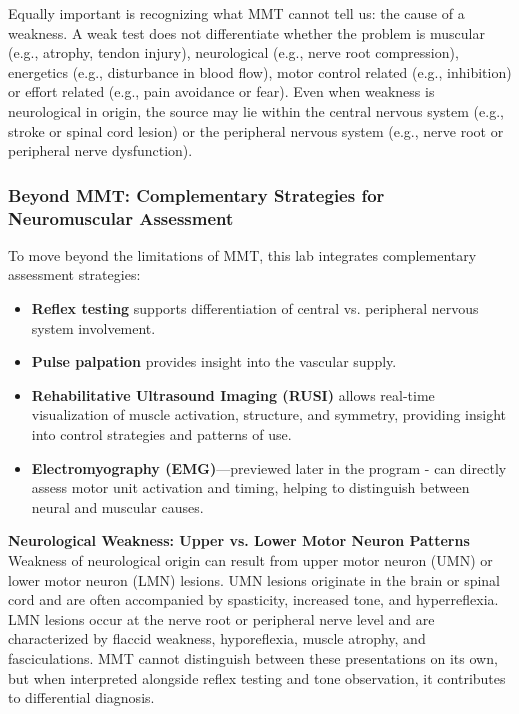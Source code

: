 Equally important is recognizing what MMT cannot tell us: the cause of a weakness. A weak test does not differentiate whether the problem is muscular (e.g., atrophy, tendon injury), neurological (e.g., nerve root compression), energetics (e.g., disturbance in blood flow), motor control related (e.g., inhibition) or effort related (e.g., pain avoidance or fear). Even when weakness is neurological in origin, the source may lie within the central nervous system (e.g., stroke or spinal cord lesion) or the peripheral nervous system (e.g., nerve root or peripheral nerve dysfunction).


\subsubsection*{Beyond MMT: Complementary Strategies for Neuromuscular Assessment}

To move beyond the limitations of MMT, this lab integrates complementary assessment strategies:

\begin{itemize}
  \item \textbf{Reflex testing} supports differentiation of central vs. peripheral nervous system involvement.
  \item \textbf{Pulse palpation} provides insight into the vascular supply.
  \item \textbf{Rehabilitative Ultrasound Imaging (RUSI)} allows real-time visualization of muscle activation, structure, and symmetry, providing insight into control strategies and patterns of use.
  \item \textbf{Electromyography (EMG)}—previewed later in the program - can directly assess motor unit activation and timing, helping to distinguish between neural and muscular causes.
\end{itemize}

\vspace{1em}
\noindent
\textbf{Neurological Weakness: Upper vs. Lower Motor Neuron Patterns} \\
Weakness of neurological origin can result from upper motor neuron (UMN) or lower motor neuron (LMN) lesions. UMN lesions originate in the brain or spinal cord and are often accompanied by spasticity, increased tone, and hyperreflexia. LMN lesions occur at the nerve root or peripheral nerve level and are characterized by flaccid weakness, hyporeflexia, muscle atrophy, and fasciculations. MMT cannot distinguish between these presentations on its own, but when interpreted alongside reflex testing and tone observation, it contributes to differential diagnosis.

